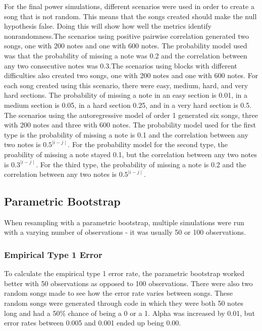 \documentclass[12pt, letterpaper]{article}
\begin{document}
For the final power simulations, different scenarios were used in order to create a song that is not random. This means that the songs created should make the null hypothesis false. Doing this will show how well the metrics identify nonrandomness.The scenarios using positive pairwise correlation generated two songs, one with 200 notes and one with 600 notes. The probability model used was that the probability of missing a note was 0.2 and the correlation between any two consecutive notes was 0.3.The scenarios using blocks with different difficulties also created two songs, one with 200 notes and one with 600 notes. For each song created using this scenario, there were easy, medium, hard, and very hard sections. The probability of missing a note in an easy section is 0.01, in a medium section is 0.05, in a hard section 0.25, and in a very hard section is 0.5. The scenarios using the autoregressive model of order 1 generated six songs, three with 200 notes and three with 600 notes. The probability model used for the first type is the probability of missing a note is 0.1 and the correlation between any two notes is $0.5^{\mid i-j \mid}$. For the probability model for the second type, the proability of missing a note stayed 0.1, but the correlation between any two notes is $0.3^{\mid i-j \mid}$. For the third type, the probability of missing a note is 0.2 and the correlation between any two notes is $0.5^{\mid i-j \mid}$.

\subsection{Parametric Bootstrap}
When resampling with a parametric bootstrap, multiple simulations were run with a varying number of observations - it was usually 50 or 100 observations.  

\subsubsection{Empirical Type 1 Error} 
To calculate the empirical type 1 error rate, the parametric bootstrap worked better with 50 observations as opposed to 100 observations.  There were also two random songs made to see how the error rate varies between songs.  These random songs were generated through code in which they were both 50 notes long and had a 50\% chance of being a 0 or a 1.  Alpha was increased by 0.01, but error rates between 0.005 and 0.001 ended up being 0.00. 
\end{document}
